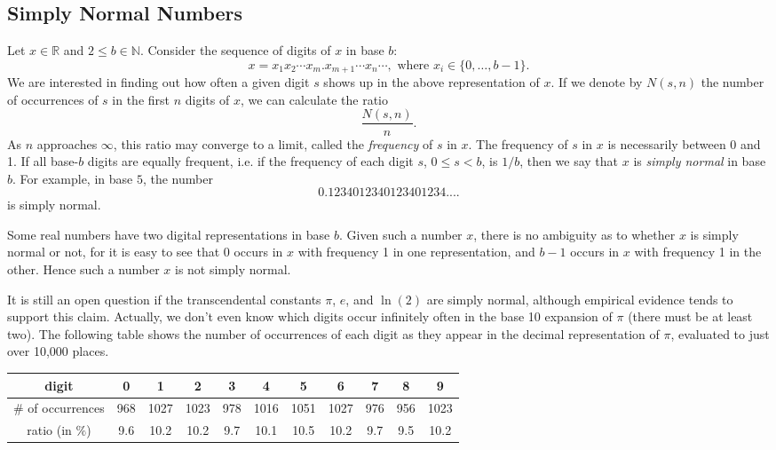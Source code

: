 \documentclass[12pt]{article}
\begin{document}

\subsection{Simply Normal Numbers}
Let $x\in\mathbb{R}$ and $2\le b\in\mathbb{N}$.  Consider the sequence of digits of $x$ in base $b$:
$$x=x_1x_2\cdots x_m.x_{m+1}\cdots x_n \cdots,\mbox{ where }x_i\in\{0,\ldots,b-1\}.$$
We are interested in finding out how often a given digit $s$ shows up in the above representation of $x$. If we denote by $N(s,n)$ the number of occurrences of $s$ in the first $n$ digits of $x$, we can calculate the ratio
$$\frac{N(s,n)}{n}.$$
As $n$ approaches $\infty$, this ratio may converge to a limit, called the \emph{frequency} of $s$ in $x$.  The frequency of $s$ in $x$ is necessarily between 0 and 1.  If all base-$b$ digits are equally frequent, i.e. if the frequency of each digit $s$, $0\le s<b$, is $1/b$, then we say that $x$ is \emph{simply normal} in base $b$.  For example, in base $5$, the number
$$0.1234012340123401234....$$
is simply normal.

Some real numbers have two digital representations in base $b$. Given such a number $x$, there is no ambiguity as to whether $x$ is simply normal or not, for it is easy to see that 0 occurs in $x$ with frequency 1 in one representation, and $b-1$ occurs in $x$ with frequency 1 in the other.  Hence such a number $x$ is not simply normal.

It is still an open question if the transcendental constants $\pi$, $e$, and $\ln(2)$ are simply normal, although empirical evidence tends to support this claim.  Actually, we don't even know which digits occur infinitely often in the base 10 expansion of $\pi$ (there must be at least two). The following table shows the number of occurrences of each digit as they appear in the decimal representation of $\pi$, evaluated to just over 10,000 places.

\begin{center}
\small
\begin{tabular}{|c|c|c|c|c|c|c|c|c|c|c|}
\hline
digit & 0 & 1 & 2 & 3 & 4 & 5 & 6 & 7 & 8 & 9 \\
\hline
$\#$ of occurrences & 968 & 1027 & 1023 & 978 & 1016 & 1051 & 1027 & 976 & 956 & 1023 \\
\hline
ratio (in $\%$) & 9.6 & 10.2 & 10.2 & 9.7 & 10.1 & 10.5 & 10.2 & 9.7 & 9.5 & 10.2 \\
\hline
\end{tabular}
\end{center}
\end{document}
